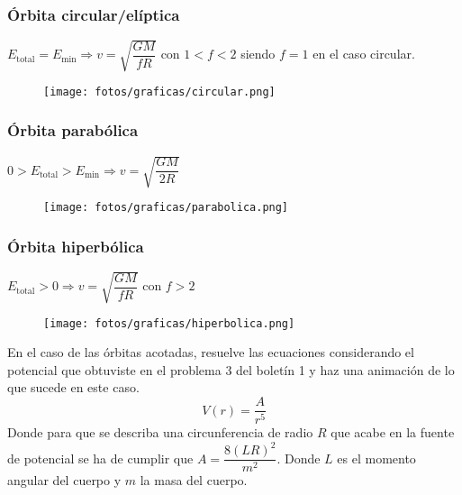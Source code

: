 \documentclass[11pt]{article}
\newcommand{\laputa}[1]{\begin{note}{#1}{}\end{note}}
\begin{document}
            \vspace{-0.2cm}
            \subsubsection*{Órbita circular/elíptica}
            \vspace{-0.2cm}
            $E_\text{total}=E_\text{min}\Longrightarrow v=\sqrt{\dfrac{GM}{fR}}$
            con $1< f < 2$ siendo $f=1$ en el caso circular.

            \begin{figure}[h]
                \centering
                \texttt{[image: fotos/graficas/circular.png]}
            \end{figure}
            
            \vspace{-0.9cm}
            \subsubsection*{Órbita parabólica}
            \vspace{-0.2cm}
            $0>E_\text{total}>E_\text{min}\Longrightarrow v=\sqrt{\dfrac{GM}{2R}}$

            \begin{figure}[h]
                \centering
                \texttt{[image: fotos/graficas/parabolica.png]}
            \end{figure}

            \vspace{-0.9cm}
            \subsubsection*{Órbita hiperbólica}
            \vspace{-0.2cm}
            $E_\text{total}>0\Longrightarrow v=\sqrt{\dfrac{GM}{fR}}$
            con $f>2$

            \begin{figure}[h]
                \centering
                \texttt{[image: fotos/graficas/hiperbolica.png]}
            \end{figure}

        \clearpage
        \laputa{En el caso de las órbitas acotadas, resuelve las ecuaciones considerando el potencial que obtuviste en el problema 3 del boletín 1 y haz una animación de lo que sucede en este caso.
        \[V(r)=\dfrac{A}{r^5}\]
        Donde para que se describa una circunferencia de radio $R$ que acabe en la fuente de potencial se ha de cumplir que $A=\dfrac{8(LR)^2}{m^2}$. Donde $L$ es el momento angular del cuerpo y $m$ la masa del cuerpo.}
\end{document}

